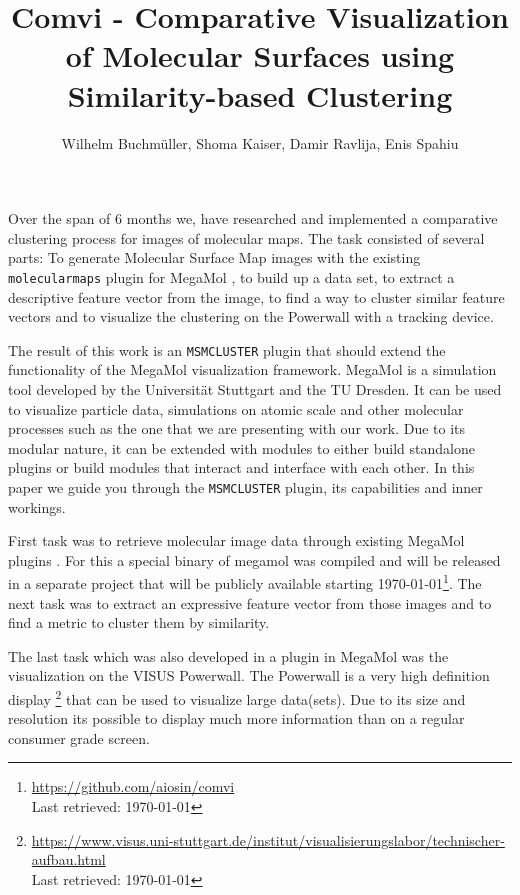 \documentclass[journal]{vgtc}       %
\title{Comvi - Comparative Visualization of Molecular Surfaces using Similarity-based Clustering}
\author{Wilhelm Buchm\"uller, Shoma Kaiser, Damir Ravlija, Enis Spahiu}
\newcommand{\todo}[1]{\textcolor{red}{\textbf{TODO:} #1}}
\begin{document}

\label{sec:intro}
%
\maketitle
%
Over the span of 6 months we,  have researched and implemented a comparative clustering  process for images of molecular maps.
The task consisted of several parts: To generate Molecular Surface Map images with the existing \verb|molecularmaps| plugin for MegaMol \cite{MegaMol}, to build up a data set, to extract a descriptive feature vector from the image, to find a way to cluster similar feature vectors and to visualize the clustering on the Powerwall with a tracking device.

The result of this work is an \verb|MSMCLUSTER| plugin that should extend the functionality of the MegaMol\cite{MegaMol} visualization framework. MegaMol is a simulation tool developed by the Universit\"at Stuttgart and the TU Dresden. It can be used to visualize particle data, simulations on atomic scale and other molecular processes such as the one that we are presenting with our work. 
Due to its modular nature, it can be extended with modules to either build standalone plugins or build modules that interact and interface with each other.
In this paper we guide you through the \verb|MSMCLUSTER| plugin, its capabilities and inner workings.

First task was to retrieve molecular image data through existing MegaMol plugins \cite{molecularmaps}. For this a special binary of megamol was compiled and will be released in a separate project that will be publicly available starting \today \footnote{\url{https://github.com/aiosin/comvi}\\ Last retrieved: \today}.
The next task was to extract an expressive feature vector from those images and to find a metric to cluster them by similarity.

The last task which was also developed in a plugin in MegaMol was the visualization on the VISUS Powerwall. The Powerwall is a very high definition display \footnote{\url{https://www.visus.uni-stuttgart.de/institut/visualisierungslabor/technischer-aufbau.html} \\ Last retrieved: \today } that can be used to visualize large data(sets). Due to its size and resolution its possible to display much more information than on a regular consumer grade screen. 
\end{document}
